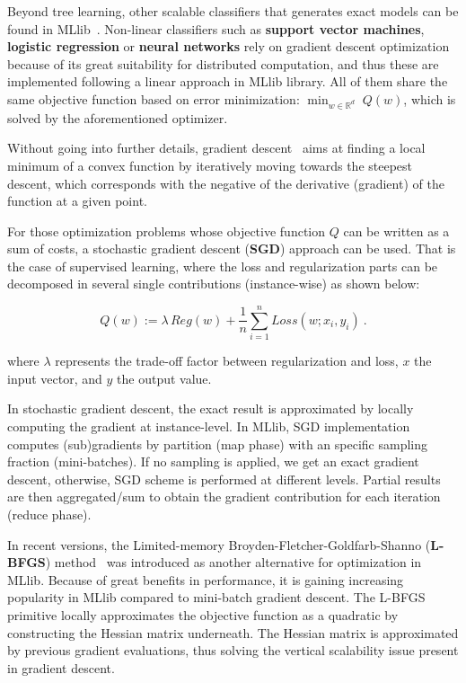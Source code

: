 \documentclass[3p,review]{elsarticle}
\begin{document}
	Beyond tree learning, other scalable classifiers that generates exact models can be found in MLlib~\cite{mllibguide}. Non-linear classifiers such as \textbf{support vector machines}, \textbf{logistic regression} or \textbf{neural networks} rely on gradient descent optimization because of its great suitability for distributed computation, and thus these are implemented following a linear approach in MLlib library. All of them share the same objective function based on error minimization: $\min_{w \in \mathbb{R}^d} \; Q(w)$, which is solved by the aforementioned optimizer.
	
	Without going into further details, gradient descent~\cite{hastie11} aims at finding a local minimum of a convex function by iteratively moving towards the steepest descent, which corresponds with the negative of the derivative (gradient) of the function at a given point. 
	
	For those optimization problems whose objective function $Q$ can be written as a sum of costs, a stochastic gradient descent (\textbf{SGD}) approach can be used. That is the case of supervised learning, where the loss and regularization parts can be decomposed in several single contributions (instance-wise) as shown below:
	
	\begin{equation}
	Q(w) := 
	\lambda\, Reg(w) +
	\frac1n \sum_{i=1}^n Loss(w;x_i,y_i) 
	\label{eq:regPrimal}
	\ .
	\end{equation}
	
	\noindent where $\lambda$ represents the trade-off factor between regularization and loss, $x$ the input vector, and $y$ the output value.
	
	In stochastic gradient descent, the exact result is approximated by locally computing the gradient at instance-level. In MLlib, SGD implementation computes (sub)gradients by partition (map phase) with an specific sampling fraction (mini-batches). If no sampling is applied, we get an exact gradient descent, otherwise, SGD scheme is performed at different levels. Partial results are then aggregated/sum to obtain the gradient contribution for each iteration (reduce phase).  
	
	In recent versions, the Limited-memory Broyden-Fletcher-Goldfarb-Shanno (\textbf{L-BFGS}) method~\cite{liu89} was introduced as another alternative for optimization in MLlib. Because of great benefits in performance, it is gaining increasing popularity in MLlib compared to mini-batch gradient descent. The L-BFGS primitive locally approximates the objective function as a quadratic by constructing the Hessian matrix underneath. The Hessian matrix is approximated by previous gradient evaluations, thus solving the vertical scalability issue present in gradient descent.
	
\end{document}
